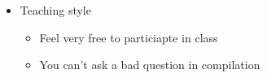 {\begin{itemize}
\begin{itemize}
\item Understand different programming paradigms

\item Learn new programming languages faster

\end{itemize}

\item Teaching style

\begin{itemize}

\item Feel very free to particiapte in class

\item You can't ask a bad question in compilation

\end{itemize}

\end{itemize}

}
